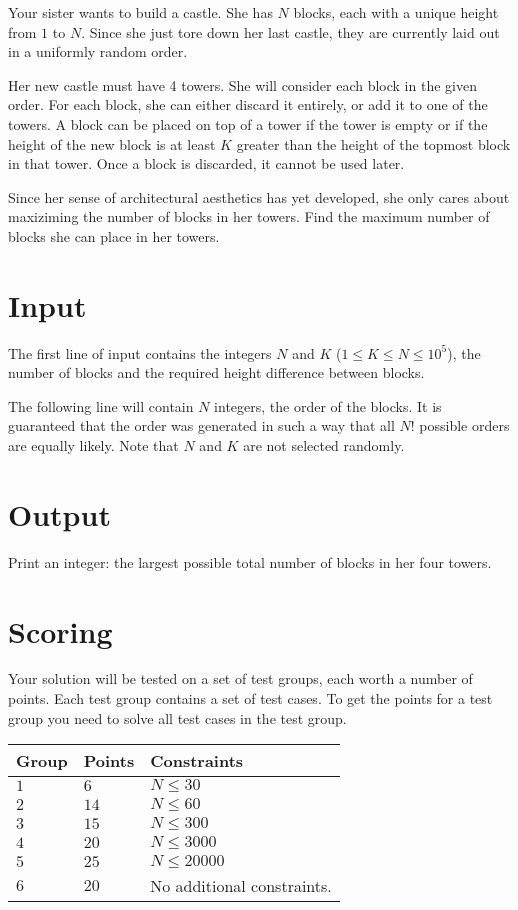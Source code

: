 \noindent

Your sister wants to build a castle. She has $N$ blocks, each with a unique
height from $1$ to $N$. Since she just tore down her last castle, they are currently 
laid out in a uniformly random order.

Her new castle must have 4 towers. She will consider each block in the 
given order. For each block, she can either discard it entirely, or add
it to one of the towers. A block can be placed on top of a tower if the tower is empty or
if the height of the new block is at least $K$ greater than the height of the topmost
block in that tower. Once a block is discarded, it cannot be used
later.

Since her sense of architectural aesthetics has yet developed, she only
cares about maxiziming the number of blocks in her towers. Find the maximum
number of blocks she can place in her towers.

\section*{Input}
The first line of input contains the integers $N$ and $K$ ($1 \leq K \leq N \leq 10^5$),
the number of blocks and the required height difference between blocks.

The following line will contain $N$ integers, the order of the blocks. It is guaranteed
that the order was generated in such a way that all $N!$ possible orders are equally likely.
Note that $N$ and $K$ are not selected randomly.

\section*{Output}
Print an integer: the largest possible total number of blocks in her four towers.


\section*{Scoring}
Your solution will be tested on a set of test groups, each worth a number of points. Each test group contains
a set of test cases. To get the points for a test group you need to solve all test cases in the test group.

\noindent
\begin{tabular}{| l | l | p{12cm} |}
  \hline
  \textbf{Group} & \textbf{Points} & \textbf{Constraints} \\ \hline
  $1$    & $6$        & $N \leq 30$ \\ \hline
  $2$    & $14$       & $N \leq 60$ \\ \hline
  $3$    & $15$       & $N \leq 300$ \\ \hline
  $4$    & $20$       & $N \leq 3000$ \\ \hline
  $5$    & $25$       & $N \leq 20000$ \\ \hline
  $6$    & $20$       & No additional constraints. \\ \hline
\end{tabular}

